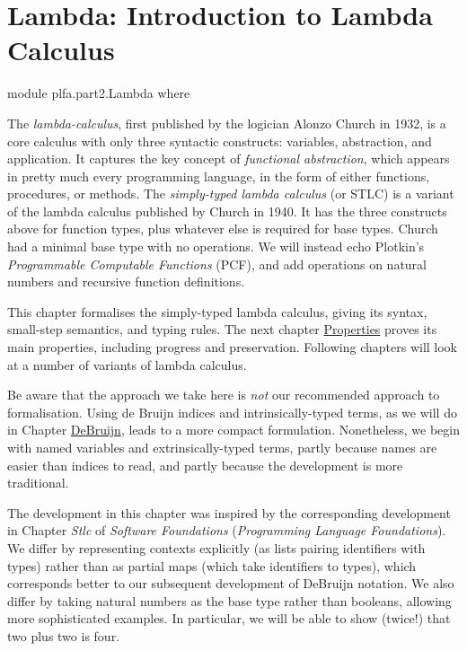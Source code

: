 \hypertarget{Lambda}{%
\chapter{Lambda: Introduction to Lambda Calculus}\label{Lambda}}

\begin{fence}
\begin{code}
module plfa.part2.Lambda where
\end{code}
\end{fence}

The \emph{lambda-calculus}, first published by the logician Alonzo
Church in 1932, is a core calculus with only three syntactic constructs:
variables, abstraction, and application. It captures the key concept of
\emph{functional abstraction}, which appears in pretty much every
programming language, in the form of either functions, procedures, or
methods. The \emph{simply-typed lambda calculus} (or STLC) is a variant
of the lambda calculus published by Church in 1940. It has the three
constructs above for function types, plus whatever else is required for
base types. Church had a minimal base type with no operations. We will
instead echo Plotkin's \emph{Programmable Computable Functions} (PCF),
and add operations on natural numbers and recursive function
definitions.

This chapter formalises the simply-typed lambda calculus, giving its
syntax, small-step semantics, and typing rules. The next chapter
\protect\hyperlink{Properties}{Properties} proves its main properties,
including progress and preservation. Following chapters will look at a
number of variants of lambda calculus.

Be aware that the approach we take here is \emph{not} our recommended
approach to formalisation. Using de Bruijn indices and
intrinsically-typed terms, as we will do in Chapter
\protect\hyperlink{DeBruijn}{DeBruijn}, leads to a more compact
formulation. Nonetheless, we begin with named variables and
extrinsically-typed terms, partly because names are easier than indices
to read, and partly because the development is more traditional.

The development in this chapter was inspired by the corresponding
development in Chapter \emph{Stlc} of \emph{Software Foundations}
(\emph{Programming Language Foundations}). We differ by representing
contexts explicitly (as lists pairing identifiers with types) rather
than as partial maps (which take identifiers to types), which
corresponds better to our subsequent development of DeBruijn notation.
We also differ by taking natural numbers as the base type rather than
booleans, allowing more sophisticated examples. In particular, we will
be able to show (twice!) that two plus two is four.

